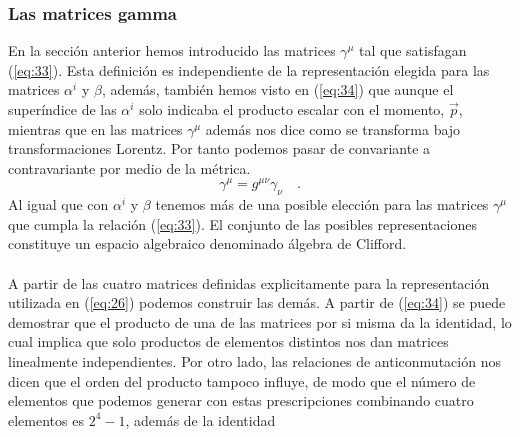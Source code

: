 \documentclass[11pt,letterpaper]{article}     %
\begin{document}
\subsubsection{Las matrices gamma} 






En la sección anterior hemos introducido las matrices $\gamma^\mu$ tal que satisfagan (\ref{eq:33}). Esta definición es independiente de la representación elegida para las matrices $\alpha^i$ y $\beta$, además, también hemos visto en (\ref{eq:34}) que aunque el superíndice de las $\alpha^i$ solo indicaba el producto escalar con el momento, $\vec{p}$, mientras que en las matrices $\gamma^\mu$ además nos dice como se transforma bajo transformaciones Lorentz. Por tanto podemos pasar de convariante a contravariante por medio de la métrica.
\begin{equation} \label{eq:37}
\gamma^\mu = g^{\mu \nu} \gamma_\nu \quad.
\end{equation}
Al igual que con $\alpha^i$ y $\beta$ tenemos más de una posible elección para las matrices $\gamma^\mu$ que cumpla la relación (\ref{eq:33}). El conjunto de las posibles representaciones constituye un espacio algebraico denominado álgebra de Clifford. \\ \\
A partir de las cuatro matrices definidas explicitamente para la representación utilizada en (\ref{eq:26}) podemos construir las demás. A partir de (\ref{eq:34}) se puede demostrar que el producto de una de las matrices por si misma da la identidad, lo cual implica que solo productos de elementos distintos nos dan matrices linealmente independientes. Por otro lado, las relaciones de anticonmutación nos dicen que el orden del producto tampoco influye, de modo que el número de elementos que podemos generar con estas prescripciones combinando cuatro elementos es $2^4-1$, además de la identidad
\end{document}
